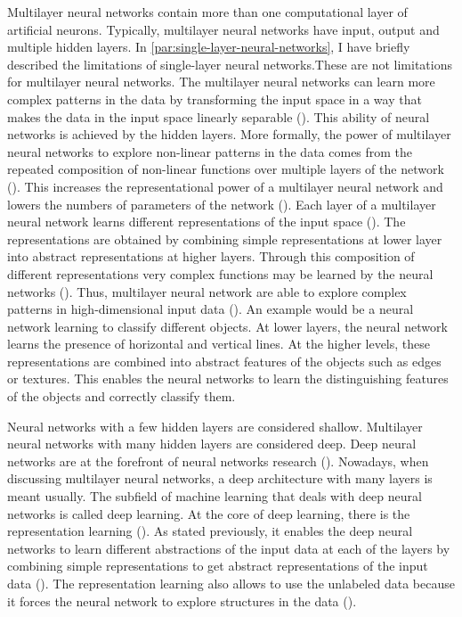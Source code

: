 \documentclass{BachelorBUI}
\begin{document}
                Multilayer neural networks contain more than one computational layer of artificial neurons. Typically, multilayer neural networks have input, output and multiple hidden layers. In \autoref{par:single-layer-neural-networks}, I have briefly described the limitations of single-layer neural networks.These are not limitations for multilayer neural networks. The multilayer neural networks can learn more complex patterns in the data by transforming the input space in a way that makes the data in the input space linearly separable (\cite{LeCun:2015}). This ability of neural networks is achieved by the hidden layers. More formally, the power of multilayer neural networks to explore non-linear patterns in the data comes from the repeated composition of non-linear functions over multiple layers of the network (\cite{Aggarwal:2018}). This increases the representational power of a multilayer neural network and lowers the numbers of parameters of the network (\cite{Aggarwal:2018}). Each layer of a multilayer neural network learns different representations of the input space (\cite{LeCun:2015}). The representations are obtained by combining simple representations at lower layer into abstract representations at higher layers. Through this composition of different representations very complex functions may be learned by the neural networks (\cite{Bishop:2024}). Thus, multilayer neural network are able to explore complex patterns in high-dimensional input data (\cite{LeCun:2015}). An example would be a neural network learning to classify different objects. At lower layers, the neural network learns the presence of horizontal and vertical lines. At the higher levels, these representations are combined into abstract features of the objects such as edges or textures. This enables the neural networks to learn the distinguishing features of the objects and correctly classify them.
                
                Neural networks with a few hidden layers are considered shallow. Multilayer neural networks with many hidden layers are considered deep. Deep neural networks are at the forefront of neural networks research (\cite{LeCun:2015}). Nowadays, when discussing multilayer neural networks, a deep architecture with many layers is meant usually. The subfield of machine learning that deals with deep neural networks is called deep learning. At the core of deep learning, there is the representation learning (\cite{LeCun:2015}). As stated previously, it enables the deep neural networks to learn different abstractions of the input data at each of the layers by combining simple representations to get abstract representations of the input data (\cite{LeCun:2015}). The representation learning also allows to use the unlabeled data because it forces the neural network to explore structures in the data (\cite{Bishop:2024}).
\end{document}
